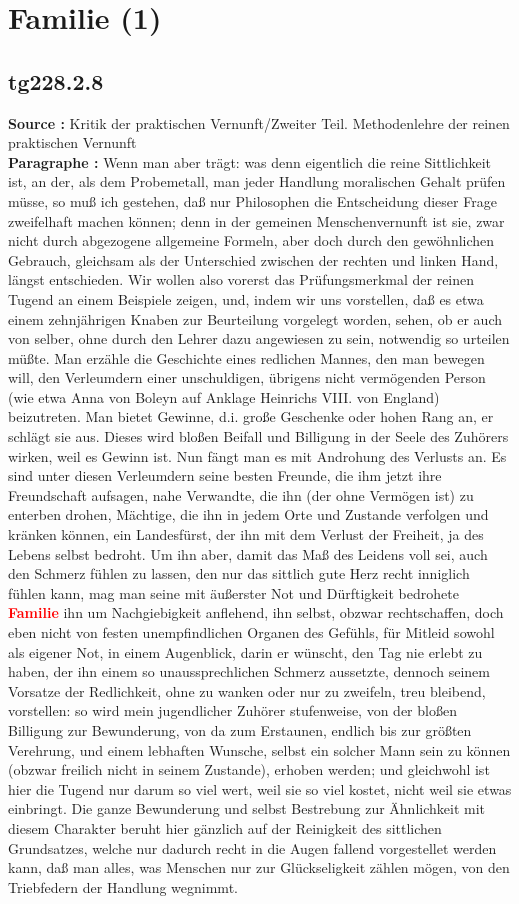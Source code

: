 \documentclass[a4paper,12pt,twoside]{book}
\newcommand{\match}[1]{\textcolor{red}{\textbf{#1}}}
\newcommand{\unnumberedsection}[1]{
	\section*{#1}
	\addcontentsline{toc}{section}{#1}
	\markright{#1}
}
\begin{document}
	\unnumberedsection{Familie (1)} 
	\subsection*{tg228.2.8} 
	\textbf{Source : }Kritik der praktischen Vernunft/Zweiter Teil. Methodenlehre der reinen praktischen Vernunft\\  
	
	\noindent\textbf{Paragraphe : }
	Wenn man aber trägt: was denn eigentlich die reine Sittlichkeit ist, an der, als dem Probemetall, man jeder Handlung moralischen Gehalt prüfen müsse, so muß ich gestehen, daß nur Philosophen die Entscheidung dieser Frage zweifelhaft machen können; denn in der gemeinen Menschenvernunft ist sie, zwar nicht durch abgezogene allgemeine Formeln, aber doch durch den gewöhnlichen Gebrauch, gleichsam als der Unterschied zwischen der rechten und linken Hand, längst entschieden. Wir wollen also vorerst das Prüfungsmerkmal der reinen Tugend an einem Beispiele zeigen, und, indem wir uns vorstellen, daß es etwa einem zehnjährigen Knaben zur Beurteilung vorgelegt worden, sehen, ob er auch von selber, ohne durch den Lehrer dazu angewiesen zu sein, notwendig so urteilen müßte. Man erzähle die Geschichte eines redlichen Mannes, den man bewegen will, den Verleumdern einer unschuldigen, übrigens nicht vermögenden Person (wie etwa Anna von Boleyn auf Anklage Heinrichs VIII. von England) beizutreten. Man bietet Gewinne, d.i. große Geschenke oder hohen Rang an, er schlägt sie aus. Dieses wird bloßen Beifall und Billigung in der Seele des Zuhörers wirken, weil es Gewinn ist. Nun fängt man es mit Androhung des Verlusts an. Es sind unter diesen Verleumdern seine besten Freunde, die ihm jetzt ihre Freundschaft aufsagen, nahe Verwandte, die ihn (der ohne Vermögen ist) zu enterben drohen, Mächtige, die ihn in jedem Orte und Zustande verfolgen und kränken können, ein Landesfürst, der ihn mit dem Verlust der Freiheit, ja des Lebens selbst bedroht. Um ihn aber, damit das Maß des Leidens voll sei, auch den Schmerz fühlen zu lassen, den nur  das sittlich gute Herz recht inniglich fühlen kann, mag man seine mit äußerster Not und Dürftigkeit bedrohete \match{Familie} ihn um Nachgiebigkeit anflehend, ihn selbst, obzwar rechtschaffen, doch eben nicht von festen unempfindlichen Organen des Gefühls, für Mitleid sowohl als eigener Not, in einem Augenblick, darin er wünscht, den Tag nie erlebt zu haben, der ihn einem so unaussprechlichen Schmerz aussetzte, dennoch seinem Vorsatze der Redlichkeit, ohne zu wanken oder nur zu zweifeln, treu bleibend, vorstellen: so wird mein jugendlicher Zuhörer stufenweise, von der bloßen Billigung zur Bewunderung, von da zum Erstaunen, endlich bis zur größten Verehrung, und einem lebhaften Wunsche, selbst ein solcher Mann sein zu können (obzwar freilich nicht in seinem Zustande), erhoben werden; und gleichwohl ist hier die Tugend nur darum so viel wert, weil sie so viel kostet, nicht weil sie etwas einbringt. Die ganze Bewunderung und selbst Bestrebung zur Ähnlichkeit mit diesem Charakter beruht hier gänzlich auf der Reinigkeit des sittlichen Grundsatzes, welche nur dadurch recht in die Augen fallend vorgestellet werden kann, daß man alles, was Menschen nur zur Glückseligkeit zählen mögen, von den Triebfedern der Handlung wegnimmt. 
\end{document}

